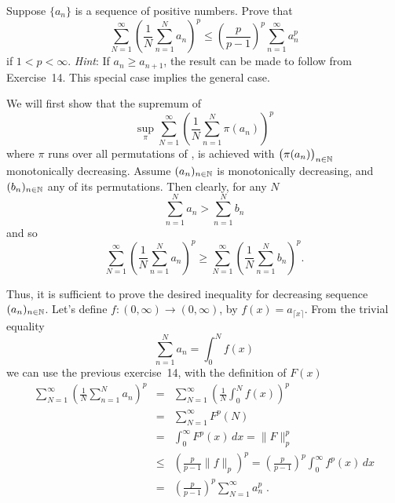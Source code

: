 \begin{enumerate}


\begin{excopy}
Suppose \(\{a_n\}\) is a sequence of positive numbers. Prove that
\begin{equation*}
 \sum_{N=1}^\infty \left(\frac{1}{N} \sum_{n=1}^N a_n\right)^p
 \leq
 \left(\frac{p}{p-1}\right)^p \sum_{n=1}^\infty a_n^p
\end{equation*}
if \(1<p<\infty\). \emph{Hint}: If \(a_n\geq a_{n+1}\), the result can be made
 to follow from Exercise~14.
 This special case implies the general case.
\end{excopy}

We will first show that the supremum of
\begin{equation*}
 \sup_\pi \sum_{N=1}^\infty \left(\frac{1}{N} \sum_{n=1}^N \pi(a_n)\right)^p
\end{equation*}
where \(\pi\) runs over all permutations of \N, is achieved with
\(\bigl(\pi(a_n)\bigr)_{n\in\mathbb{N}}\) monotonically decreasing.
Assume \((a_n)_{n\in\mathbb{N}}\) is monotonically decreasing, and
\((b_n)_{n\in\mathbb{N}}\) any of its permutations.
Then clearly, for any $N$
\begin{equation*}
 \sum_{n=1}^N a_n > \sum_{n=1}^N b_n
\end{equation*}
and so
\begin{equation*}
 \sum_{N=1}^\infty \left(\frac{1}{N} \sum_{n=1}^N a_n\right)^p
 \geq
 \sum_{N=1}^\infty \left(\frac{1}{N} \sum_{n=1}^N b_n\right)^p.
\end{equation*}

Thus, it is sufficient to prove the desired inequality for
decreasing sequence \((a_n)_{n\in\mathbb{N}}\).
Let's define \(f:(0,\infty)\to (0,\infty)\), by
\(f(x) = a_{\lceil x \rceil}\).
From the trivial equality
\begin{equation*}
 \sum_{n=1}^N a_n = \int_0^N f(x)
\end{equation*}
we can use the previous exercise~14, with the definition of \(F(x)\)
\begin{eqnarray*}
 \sum_{N=1}^\infty \left(\frac{1}{N} \sum_{n=1}^N a_n\right)^p
 &=& \sum_{N=1}^\infty \left(\frac{1}{N} \int_0^N f(x) \right)^p \\
 &=& \sum_{N=1}^\infty F^p(N) \\
 &=& \int_0^\infty F^p(x)\,dx = \|F\|_p^p \\
 &\leq& \left(\frac{p}{p-1} \|f\|_p\right)^p
        = \left(\frac{p}{p-1}\right)^p \int_0^\infty f^p(x)\,dx  \\
 &=&  \left(\frac{p}{p-1}\right)^p \sum_{N=1}^\infty a_n^p\;.
\end{eqnarray*}




\end{enumerate}

